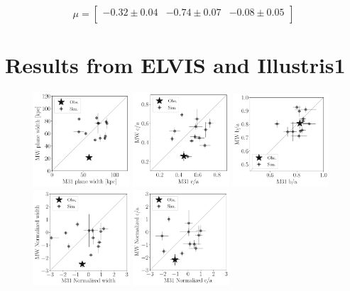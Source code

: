 \documentclass[a4paper,fleqn,usenatbib]{mnras}
\begin{document}
\[
\mu= 
\begin{bmatrix}
-0.32\pm 0.04 & -0.74\pm 0.07 &-0.08\pm 0.05\\
\end{bmatrix}
\]


\section{Results from ELVIS and Illustris1}
\label{appendix:plots}
\begin{figure}
\centering
\includegraphics[width=0.32\textwidth]{scatter_ranked_elvis_width.pdf}
\includegraphics[width=0.32\textwidth]{scatter_ranked_elvis_ca_ratio.pdf}
\includegraphics[width=0.32\textwidth]{scatter_ranked_elvis_ba_ratio.pdf}
\includegraphics[width=0.32\textwidth]{scatter_norm_ranked_elvis_width.pdf}
\includegraphics[width=0.32\textwidth]{scatter_norm_ranked_elvis_ca_ratio.pdf}

\end{figure}
\end{document}
